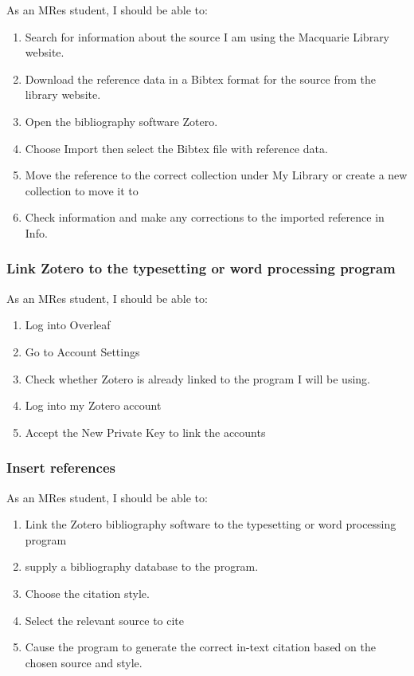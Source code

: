 \documentclass{article}
\begin{document}
As an MRes student, I should be able to:
\begin{enumerate} 
\item Search for information about the source I am using the Macquarie Library website. 
\item Download the reference data in a Bibtex format for the source from the library website. 
\item Open the bibliography software Zotero. 
\item Choose Import then select the Bibtex file with reference data. 
\item Move the reference to the correct collection under My Library or create a new collection to move it to
\item Check information and make any corrections to the imported reference in Info.
\end{enumerate} 

\subsubsection*{Link Zotero to the typesetting or word processing program}

As an MRes student, I should be able to: 
\begin{enumerate} 
\item Log into Overleaf
\item Go to Account Settings
\item Check whether Zotero is already linked to the program I will be using.
\item Log into my Zotero account
\item Accept the New Private Key to link the accounts
\end{enumerate} 

\subsubsection*{Insert references}

As an MRes student, I should be able to: 
\begin{enumerate} 
\item Link the Zotero bibliography software to the typesetting or word processing program
\item supply a bibliography database to the program. 
\item Choose the citation style.
\item Select the relevant source to cite
\item Cause the program to generate the correct in-text citation based on the chosen source and style.
\end{enumerate} 
\end{document}
